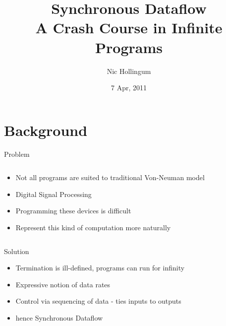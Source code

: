 \documentclass{beamer}
\title[SDF Crash Course]{Synchronous Dataflow\\A Crash Course in Infinite Programs}
\author{Nic Hollingum}
\institute{USYD}
\date{7 Apr, 2011}
\begin{document}
\begin{frame}
\titlepage
\end{frame}

\section{Background}

\begin{frame}{Problem}
\begin{columns}
\begin{column}{6cm}
\begin{itemize}
	\item Not all programs are suited to traditional Von-Neuman model
	\item Digital Signal Processing
	\item Programming these devices is difficult\cite{lee87}
	\item Represent this kind of computation more naturally
\end{itemize}
\end{column}
\begin{column}{4cm}
\end{column}
\end{columns}
\end{frame}

\begin{frame}{Solution}
\begin{itemize}
	\item Termination is ill-defined, programs can run for infinity
	\item Expressive notion of data rates
	\item Control via sequencing of data - ties inputs to outputs
	\item hence Synchronous Dataflow
\end{itemize}
\end{frame}
\end{document}
